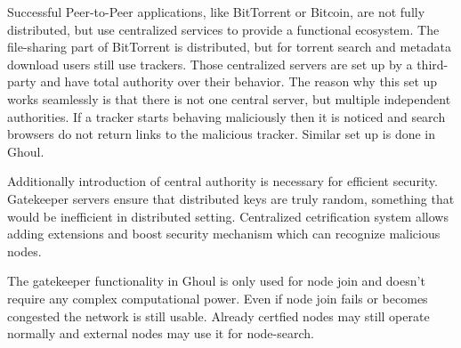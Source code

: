   Successful Peer-to-Peer applications, like BitTorrent or Bitcoin, are not
  fully distributed, but use centralized services to provide a functional
  ecosystem. The file-sharing part of BitTorrent is distributed, but for 
  torrent search and metadata download users still use trackers. Those
  centralized servers are set up by a third-party and have total authority over
  their behavior. The reason why this set up works seamlessly is that
  there is not one central server, but multiple independent authorities. If a
  tracker starts behaving maliciously then it is noticed and search browsers do
  not return links to the malicious tracker. Similar set up is done in Ghoul.

  Additionally introduction of central authority is necessary for efficient
  security. Gatekeeper servers ensure that distributed keys are truly random,
  something that would be inefficient in distributed setting. Centralized
  cetrification system allows adding extensions and boost security mechanism
  which can recognize malicious nodes.

  The gatekeeper functionality in Ghoul is only used for node join and doesn't
  require any complex computational power. Even if node join fails or becomes
  congested the network is still usable. Already certfied nodes may still
  operate normally and external nodes may use it for node-search.
